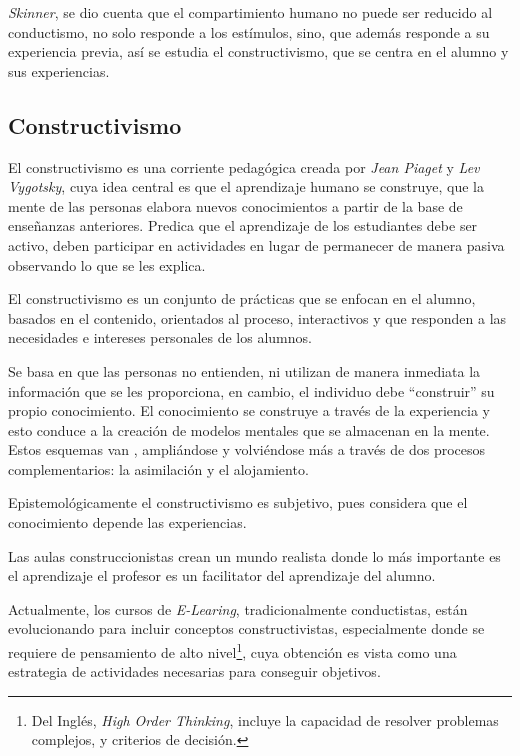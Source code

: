 \textit{Skinner}, se dio cuenta que el compartimiento humano no puede ser
reducido al conductismo, no solo responde a los estímulos, sino, que además
responde a su experiencia previa\cite{weegar2012comparison}, así se estudia el
constructivismo, que se centra en el alumno y sus experiencias.

\subsection{Constructivismo}

El constructivismo es una corriente pedagógica creada por \textit{Jean Piaget}
y \textit{Lev Vygotsky}, cuya idea central es que el aprendizaje humano se
construye, que la mente de las personas elabora nuevos conocimientos a partir
de la base de enseñanzas anteriores. Predica que el aprendizaje de los
estudiantes debe ser activo, deben participar en actividades en lugar de
permanecer de manera pasiva observando lo que se les
explica\cite{hernandez:constructivismo,johnson2005instructionism}.

El constructivismo es un conjunto de prácticas que se enfocan en el alumno,
basados en el contenido, orientados al proceso, interactivos y que responden a
las necesidades e intereses personales de los
alumnos\cite{johnson2005instructionism}.

Se basa en que las personas no entienden, ni utilizan de manera inmediata la
información que se les proporciona, en cambio, el individuo debe
\enquote{construir} su propio conocimiento. El conocimiento se construye a
través de la experiencia y esto conduce a la creación de modelos mentales que
se almacenan en la mente. Estos esquemas van , ampliándose y
volviéndose más  a través de dos procesos
complementarios: la asimilación y el
alojamiento\cite{hernandez:constructivismo,johnson2005instructionism}.

Epistemológicamente el constructivismo es subjetivo, pues considera que el
conocimiento depende las experiencias\cite{johnson2005instructionism}. 

Las aulas construccionistas crean un mundo realista donde lo más importante es
el aprendizaje el profesor es un facilitator del aprendizaje del
alumno\cite{johnson2005instructionism,nanjappa2003constructing}.

Actualmente, los cursos de \textit{E-Learing}, tradicionalmente conductistas,
están evolucionando para incluir conceptos
constructivistas\cite{weegar2012comparison}, especialmente donde se requiere de
pensamiento de alto nivel\footnote{Del Inglés, \textit{High Order Thinking},
    incluye la capacidad de resolver problemas complejos, y criterios de
    decisión.}, cuya obtención es vista como una estrategia de actividades
necesarias para conseguir objetivos\cite{miri2007purposely}.

